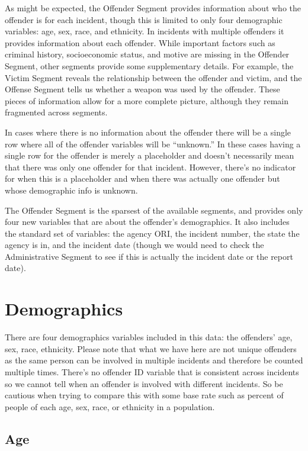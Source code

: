 \documentclass[
]{krantz}
\begin{document}
As might be expected, the Offender Segment provides
information about who the offender is for each incident,
though this is limited to only four demographic variables:
age, sex, race, and ethnicity. In incidents with multiple
offenders it provides information about each offender. While
important factors such as criminal history, socioeconomic
status, and motive are missing in the Offender Segment,
other segments provide some supplementary details. For
example, the Victim Segment reveals the relationship between
the offender and victim, and the Offense Segment tells us
whether a weapon was used by the offender. These pieces of
information allow for a more complete picture, although they
remain fragmented across segments.

In cases where there is no information about the offender
there will be a single row where all of the offender
variables will be ``unknown.'' In these cases having a
single row for the offender is merely a placeholder and
doesn't necessarily mean that there was only one offender
for that incident. However, there's no indicator for when
this is a placeholder and when there was actually one
offender but whose demographic info is unknown.

The Offender Segment is the sparsest of the available
segments, and provides only four new variables that are
about the offender's demographics. It also includes the
standard set of variables: the agency ORI, the incident
number, the state the agency is in, and the incident date
(though we would need to check the Administrative Segment to
see if this is actually the incident date or the report
date).

\section{Demographics}\label{demographics-1}

There are four demographics variables included in this data:
the offenders' age, sex, race, ethnicity. Please note that
what we have here are not unique offenders as the same
person can be involved in multiple incidents and therefore
be counted multiple times. There's no offender ID variable
that is consistent across incidents so we cannot tell when
an offender is involved with different incidents. So be
cautious when trying to compare this with some base rate
such as percent of people of each age, sex, race, or
ethnicity in a population.

\subsection{Age}\label{age-2}
\end{document}
